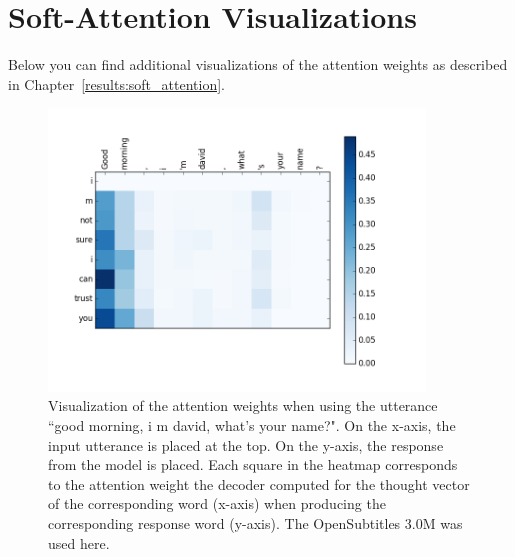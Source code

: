 \chapter{Soft-Attention Visualizations}
\label{appendix:soft_attention}

Below you can find additional visualizations of the attention weights as described in Chapter~\ref{results:soft_attention}.

\begin{figure}[H]
	\centering
	\includegraphics[width=10cm]{img/attention/attention_visualization1_OpenSubtitle-3M.png}
	\caption{Visualization of the attention weights when using the utterance ``good morning, i m david, what's your name?". On the x-axis, the input utterance is placed at the top. On the y-axis, the response from the model is placed. Each square in the heatmap corresponds to the attention weight the decoder computed for the thought vector of the corresponding word (x-axis) when producing the corresponding response word (y-axis). The OpenSubtitles 3.0M was used here.}
	\label{results:attention:example1:opensubtitles-3M}
\end{figure}

